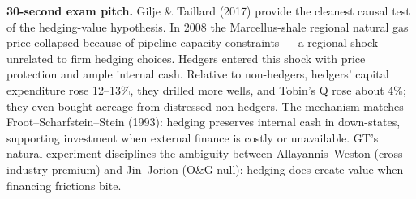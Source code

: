 \documentclass[11pt]{article}
\begin{document}
\begin{keybox}
\textbf{30-second exam pitch.} Gilje \& Taillard (2017) provide the cleanest causal test of the hedging-value hypothesis. In 2008 the Marcellus-shale regional natural gas price collapsed because of pipeline capacity constraints --- a regional shock unrelated to firm hedging choices. Hedgers entered this shock with price protection and ample internal cash. Relative to non-hedgers, hedgers' capital expenditure rose 12--13\%, they drilled more wells, and Tobin's Q rose about 4\%; they even bought acreage from distressed non-hedgers. The mechanism matches Froot--Scharfstein--Stein (1993): hedging preserves internal cash in down-states, supporting investment when external finance is costly or unavailable. GT's natural experiment disciplines the ambiguity between Allayannis--Weston (cross-industry premium) and Jin--Jorion (O\&G null): hedging does create value when financing frictions bite.
\end{keybox}
\end{document}
